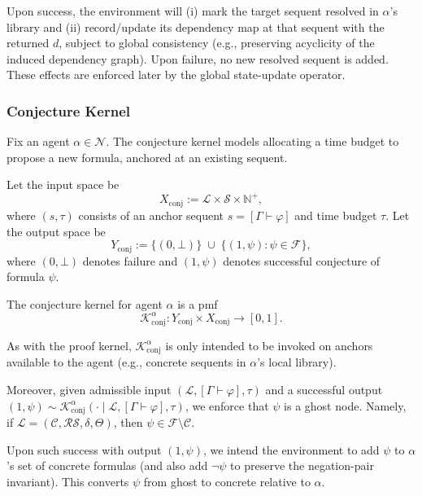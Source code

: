 \documentclass[letterpaper]{article} %
\renewcommand{\phi}{\varphi}
\newcommand{\proves}{\vdash}
\begin{document}
Upon success, the environment will (i) mark the target sequent resolved in $\alpha$'s library and
(ii) record/update its dependency map at that sequent with the returned $d$, subject to global consistency
(e.g., preserving acyclicity of the induced dependency graph). Upon failure, no new resolved sequent is added.
These effects are enforced later by the global state-update operator.

\subsubsection{Conjecture Kernel}

Fix an agent $\alpha\in\mathcal{N}$. The conjecture kernel models allocating a time budget to propose a new formula,
anchored at an existing sequent.

Let the input space be
\[
X_{\mathrm{conj}} :=\mathscr{L}\times \mathcal{S}\times \mathbb{N}^+,
\]
where $(s,\tau)$ consists of an anchor sequent $s=[\Gamma\proves\phi]$ and time budget $\tau$.
Let the output space be
\[
Y_{\mathrm{conj}} := \{(0,\bot)\}\;\cup\;\{(1,\psi): \psi\in\mathcal{F}\},
\]
where $(0,\bot)$ denotes failure and $(1,\psi)$ denotes successful conjecture of formula $\psi$.

The conjecture kernel for agent $\alpha$ is a pmf
\[
\mathcal{K}^{\alpha}_{\mathrm{conj}} : Y_{\mathrm{conj}}\times X_{\mathrm{conj}} \to [0,1].
\]

As with the proof kernel, $\mathcal{K}^{\alpha}_{\mathrm{conj}}$ is only intended to be invoked on anchors available to the agent (e.g., concrete sequents in $\alpha$'s local library).

Moreover, given admissible input $(\mathcal L, [\Gamma \proves \phi], \tau)$ and a successful output $(1,\psi) \sim \mathcal{K}_{\mathrm{conj}}^\alpha (\cdot \mid \mathcal L, [\Gamma \proves \phi], \tau)$, we enforce that $\psi$ is a ghost node. Namely, if $\mathcal{L} = (\mathcal{C},\mathcal{RS},\delta,\Theta)$, then $\psi \in \mathcal{F} \setminus \mathcal{C}$.


Upon such success with output $(1,\psi)$, we intend the environment to add $\psi$ to $\alpha$'s set of concrete formulas (and also add $\neg\psi$ to preserve the negation-pair invariant). This converts $\psi$ from ghost to concrete relative to $\alpha$.
\end{document}
